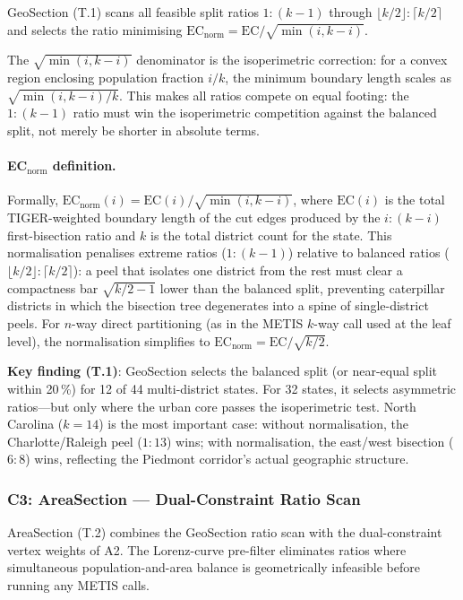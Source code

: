 GeoSection (T.1) scans all feasible split ratios $1:(k-1)$ through
$\lfloor k/2 \rfloor:\lceil k/2 \rceil$ and selects the ratio minimising
$\mathrm{EC}_\text{norm} = \mathrm{EC}/\sqrt{\min(i, k-i)}$.

The $\sqrt{\min(i,k-i)}$ denominator is the isoperimetric correction: for a
convex region enclosing population fraction $i/k$, the minimum boundary length
scales as $\sqrt{\min(i,k-i)/k}$.
This makes all ratios compete on equal footing: the $1:(k-1)$ ratio must win
the isoperimetric competition against the balanced split, not merely be shorter
in absolute terms.

\paragraph{EC$_\text{norm}$ definition.}
Formally, $\mathrm{EC}_\text{norm}(i) = \mathrm{EC}(i) / \sqrt{\min(i, k-i)}$,
where $\mathrm{EC}(i)$ is the total TIGER-weighted boundary length of the cut
edges produced by the $i:(k-i)$ first-bisection ratio and $k$ is the total
district count for the state.
This normalisation penalises extreme ratios ($1:(k-1)$) relative to balanced
ratios ($\lfloor k/2 \rfloor:\lceil k/2 \rceil$): a peel that isolates one
district from the rest must clear a compactness bar $\sqrt{k/2 - 1}$ lower
than the balanced split, preventing caterpillar districts in which the bisection
tree degenerates into a spine of single-district peels.
For $n$-way direct partitioning (as in the METIS $k$-way call used at the
leaf level), the normalisation simplifies to
$\mathrm{EC}_\text{norm} = \mathrm{EC} / \sqrt{k/2}$.

\textbf{Key finding (T.1)}: GeoSection selects the balanced split (or near-equal
split within 20\,\%) for 12 of 44 multi-district states.
For 32 states, it selects asymmetric ratios---but only where the urban core
passes the isoperimetric test.
North Carolina ($k=14$) is the most important case: without normalisation, the
Charlotte/Raleigh peel ($1:13$) wins; with normalisation, the east/west
bisection ($6:8$) wins, reflecting the Piedmont corridor's actual geographic
structure.

\subsubsection*{C3: AreaSection --- Dual-Constraint Ratio Scan}

AreaSection (T.2) combines the GeoSection ratio scan with the dual-constraint
vertex weights of A2.
The Lorenz-curve pre-filter eliminates ratios where simultaneous population-and-area
balance is geometrically infeasible before running any METIS calls.

